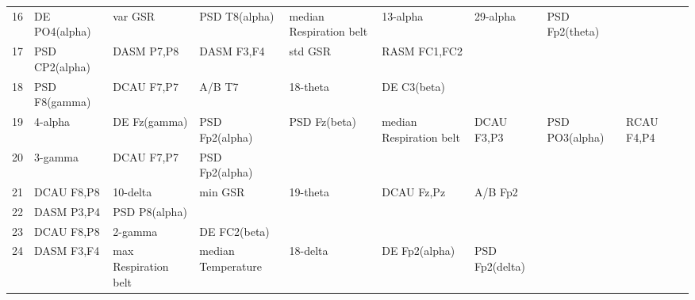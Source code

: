 \begin{landscape}
\begin{table}[]
\begin{tabular}{l|llllllll}
16       & DE PO4(alpha)         & var GSR               & PSD T8(alpha)        & median Respiration belt & 13-alpha                & 29-alpha             & PSD Fp2(theta)       &                       &                       &                    \\
17       & PSD CP2(alpha)        & DASM P7,P8            & DASM F3,F4           & std GSR                 & RASM FC1,FC2            &                      &                      &                       &                       &                    \\
18       & PSD F8(gamma)         & DCAU F7,P7            & A/B T7               & 18-theta                & DE C3(beta)             &                      &                      &                       &                       &                    \\
19       & 4-alpha               & DE Fz(gamma)          & PSD Fp2(alpha)       & PSD Fz(beta)            & median Respiration belt & DCAU F3,P3           & PSD PO3(alpha)       & RCAU F4,P4            &                       &                    \\
20       & 3-gamma               & DCAU F7,P7            & PSD Fp2(alpha)       &                         &                         &                      &                      &                       &                       &                    \\
21       & DCAU F8,P8            & 10-delta              & min GSR              & 19-theta                & DCAU Fz,Pz              & A/B Fp2              &                      &                       &                       &                    \\
22       & DASM P3,P4            & PSD P8(alpha)         &                      &                         &                         &                      &                      &                       &                       &                    \\
23       & DCAU F8,P8            & 2-gamma               & DE FC2(beta)         &                         &                         &                      &                      &                       &                       &                    \\
24       & DASM F3,F4            & max Respiration belt  & median Temperature   & 18-delta                & DE Fp2(alpha)           & PSD Fp2(delta)       &                      &                       &                       &                    \\

\end{tabular}
\end{table}
\end{landscape}
